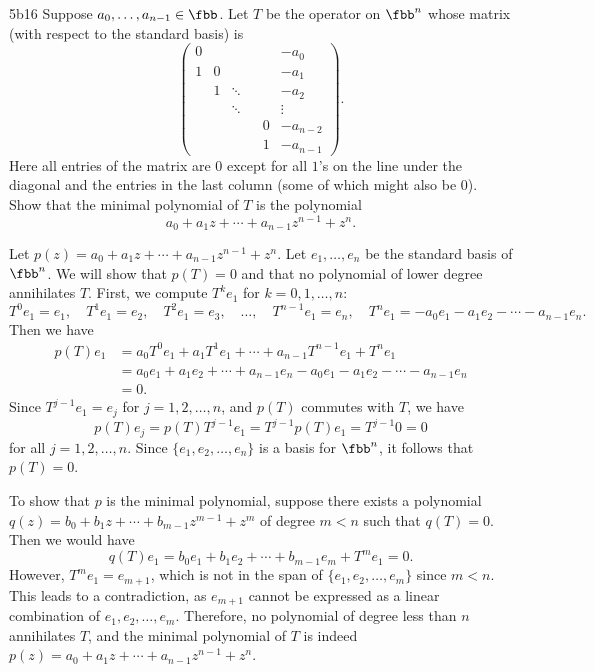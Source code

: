 \begin{exercise}{5b16}
    Suppose $a_0, \ldots, a_{n-1} \in \fbb$.
	Let $T$ be the operator on $\fbb^n$ whose matrix (with respect to the standard basis) is
    \[
        \begin{pmatrix}
            0 & & & & & -a_0 \\
            1 & 0 & & & & -a_1 \\
            & 1 & \ddots & & & -a_2 \\
            & & \ddots & & & \vdots \\
            & & & & 0 & -a_{n-2} \\
            & & & & 1 & -a_{n-1}
        \end{pmatrix}.
    \]
    Here all entries of the matrix are $0$ except for all $1$'s on the line under the diagonal and the entries in the last column (some of which might also be $0$).
	Show that the minimal polynomial of $T$ is the polynomial
    \[
    	a_0 + a_1 z + \cdots + a_{n-1} z^{n-1} + z^n.
    \]
\end{exercise}

\begin{sol}
    Let $p(z) = a_0 + a_1 z + \cdots + a_{n-1} z^{n-1} + z^n$.
    Let $e_1, \ldots, e_n$ be the standard basis of $\fbb^n$.
    We will show that $p(T) = 0$ and that no polynomial of lower degree annihilates $T$.
    First, we compute $T^k e_1$ for $k = 0, 1, \ldots, n$:
    \[
    	T^0 e_1 = e_1, \quad T^1 e_1 = e_2, \quad T^2 e_1 = e_3, \quad \ldots, \quad T^{n-1} e_1 = e_n, \quad T^n e_1 = -a_0 e_1 - a_1 e_2 - \cdots - a_{n-1} e_n.
    \]
    Then we have
    \begin{align*}
        p(T)e_1 &= a_0 T^0 e_1 + a_1 T^1 e_1 + \cdots + a_{n-1} T^{n-1} e_1 + T^n e_1 \\
        &= a_0 e_1 + a_1 e_2 + \cdots + a_{n-1} e_n - a_0 e_1 - a_1 e_2 - \cdots - a_{n-1} e_n \\
        &= 0.
    \end{align*}
    Since $T^{j-1} e_1 = e_j$ for $j = 1, 2, \ldots, n$, and $p(T)$ commutes with $T$, we have
    \[
    	p(T)e_j = p(T)T^{j-1} e_1 = T^{j-1} p(T) e_1 = T^{j-1} 0 = 0
    \]
    for all $j = 1, 2, \ldots, n$.
    Since $\{e_1, e_2, \ldots, e_n\}$ is a basis for $\fbb^n$, it follows that $p(T) = 0$.

    To show that $p$ is the minimal polynomial, suppose there exists a polynomial $q(z) = b_0 + b_1 z + \cdots + b_{m-1} z^{m-1} + z^m$ of degree $m < n$ such that $q(T) = 0$.
    Then we would have
    \[
    	q(T)e_1 = b_0 e_1 + b_1 e_2 + \cdots + b_{m-1} e_m + T^m e_1 = 0.
    \]
    However, $T^m e_1 = e_{m+1}$, which is not in the span of $\{e_1, e_2, \ldots, e_m\}$ since $m < n$.
    This leads to a contradiction, as $e_{m+1}$ cannot be expressed as a linear combination of $e_1, e_2, \ldots, e_m$.
    Therefore, no polynomial of degree less than $n$ annihilates $T$, and the minimal polynomial of $T$ is indeed $p(z) = a_0 + a_1 z + \cdots + a_{n-1} z^{n-1} + z^n$.
\end{sol}

